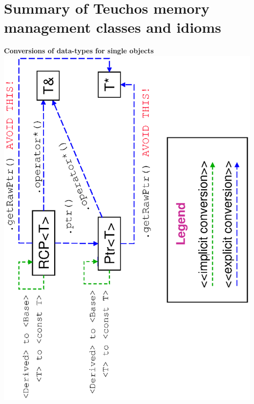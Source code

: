 

%
{}\section{Summary of Teuchos memory management classes and idioms}
\label{apdx:summary_of_idioms}
%

\begin{center}















\pagebreak



\pagebreak



\pagebreak





\pagebreak

{}\textbf{Conversions of data-types for single objects}
\includegraphics*[angle=270,scale=0.65]{TeuchosPtrConversions} \\[5ex]


\end{center}
